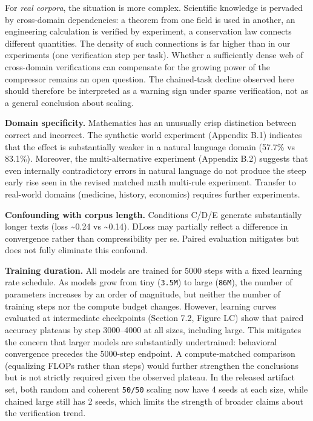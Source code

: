 \documentclass[
  11pt,
]{article}
\begin{document}
For \emph{real corpora}, the situation is more complex. Scientific
knowledge is pervaded by cross-domain dependencies: a theorem from one
field is used in another, an engineering calculation is verified by
experiment, a conservation law connects different quantities. The
density of such connections is far higher than in our experiments (one
verification step per task). Whether a sufficiently dense web of
cross-domain verifications can compensate for the growing power of the
compressor remains an open question. The chained-task decline observed
here should therefore be interpreted as a warning sign under sparse
verification, not as a general conclusion about scaling.

\textbf{Domain specificity.} Mathematics has an unusually crisp
distinction between correct and incorrect. The synthetic world
experiment (Appendix B.1) indicates that the effect is substantially
weaker in a natural language domain (57.7\% vs 83.1\%). Moreover, the
multi-alternative experiment (Appendix B.2) suggests that even
internally contradictory errors in natural language do not produce the
steep early rise seen in the revised matched math multi-rule experiment.
Transfer to real-world domains (medicine, history, economics) requires
further experiments.

\textbf{Confounding with corpus length.} Conditions C/D/E generate
substantially longer texts (loss \textasciitilde0.24 vs
\textasciitilde0.14). DLoss may partially reflect a difference in
convergence rather than compressibility per se. Paired evaluation
mitigates but does not fully eliminate this confound.

\textbf{Training duration.} All models are trained for 5000 steps with a
fixed learning rate schedule. As models grow from tiny (\texttt{3.5M})
to large (\texttt{86M}), the number of parameters increases by an order
of magnitude, but neither the number of training steps nor the compute
budget changes. However, learning curves evaluated at intermediate
checkpoints (Section 7.2, Figure LC) show that paired accuracy plateaus
by step 3000--4000 at all sizes, including large. This mitigates the
concern that larger models are substantially undertrained: behavioral
convergence precedes the 5000-step endpoint. A compute-matched
comparison (equalizing FLOPs rather than steps) would further strengthen
the conclusions but is not strictly required given the observed plateau.
In the released artifact set, both random and coherent \texttt{50/50}
scaling now have 4 seeds at each size, while chained large still has 2
seeds, which limits the strength of broader claims about the
verification trend.
\end{document}
